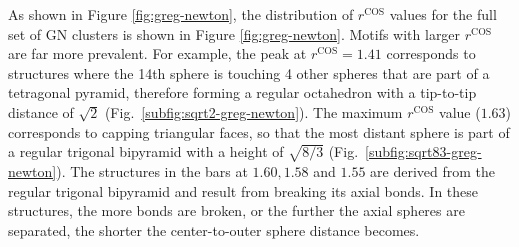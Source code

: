 As shown in Figure \ref{fig:greg-newton}, the distribution of $r^\text{COS}$
values for the full set of GN clusters is shown in Figure
\ref{fig:greg-newton}.  Motifs with larger $r^\text{COS}$ are far more
prevalent.  For example, the peak at $r^\text{COS} = 1.41$ corresponds to
structures where the 14th sphere is touching 4 other spheres that are part of a
tetragonal pyramid, therefore forming a regular octahedron with a tip-to-tip
distance of $\sqrt{2}$ (Fig.~\ref{subfig:sqrt2-greg-newton}).  The maximum
$r^\text{COS}$ value ($1.63$) corresponds to capping triangular faces, so that
the most distant sphere is part of a regular trigonal bipyramid with a height
of $\sqrt{8/3}$ (Fig.~\ref{subfig:sqrt83-greg-newton}).  The structures in the
bars at $1.60,1.58$ and $1.55$ are derived from the regular trigonal bipyramid
and result from breaking its axial bonds.  In these structures, the more bonds
are broken, or the further the axial spheres are separated, the shorter the
center-to-outer sphere distance becomes.
